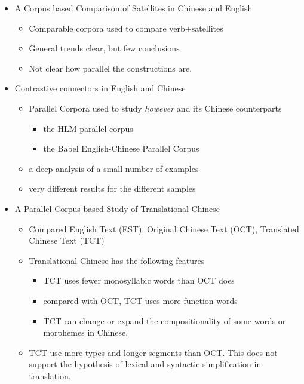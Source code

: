 \documentclass[a4paper,landscape,headrule,footrule,dvips]{foils}
\begin{document}
\begin{CJK}{UTF8}{min}
\begin{itemize}
\item A Corpus based Comparison of Satellites in Chinese and English
  \begin{itemize}
  \item Comparable corpora used to compare verb+satellites
  \item General trends clear, but few conclusions
  \item Not clear how parallel the constructions are.
  \end{itemize}
\item Contrastive connectors in English and Chinese
  \begin{itemize}
  \item Parallel Corpora used to study  \textit{however} and its Chinese counterparts
    \begin{itemize}
    \item the HLM parallel corpus
    \item the Babel English-Chinese Parallel Corpus
    \end{itemize}
  \item a deep analysis of a small number of examples
  \item very different results for the different samples
  \end{itemize}
\newpage
\item A Parallel Corpus-based Study of Translational Chinese
\begin{itemize}
\item Compared English Text (EST), Original Chinese Text (OCT),
  Translated Chinese Text (TCT)
\item Translational Chinese has the following features
  \begin{itemize}
  \item TCT uses fewer monosyllabic words than OCT does
  \item compared with OCT, TCT uses more function words
  \item TCT can change or expand the compositionality of some words or morphemes in
    Chinese.
\end{itemize}
\item TCT use more types and longer segments than OCT. This does not
  support the hypothesis of lexical and syntactic simplification in translation.
\end{itemize}
\end{itemize}


\end{CJK}
\end{document}

